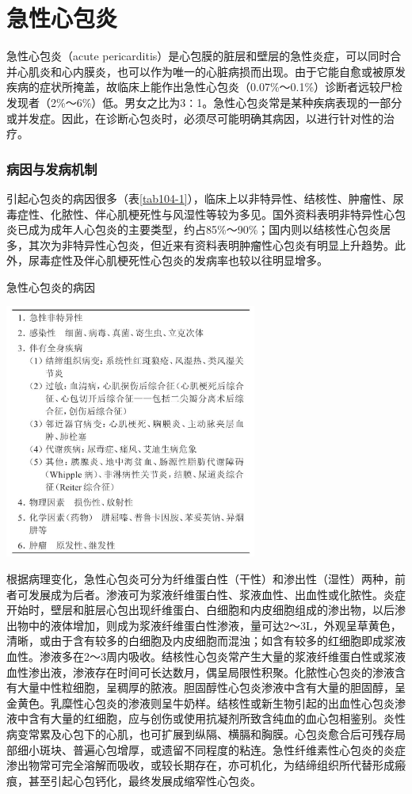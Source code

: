 \chapter{急性心包炎}

急性心包炎（acute
pericarditis）是心包膜的脏层和壁层的急性炎症，可以同时合并心肌炎和心内膜炎，也可以作为唯一的心脏病损而出现。由于它能自愈或被原发疾病的症状所掩盖，故临床上能作出急性心包炎（0.07\%～0.1\%）诊断者远较尸检发现者（2\%～6\%）低。男女之比为3∶1。急性心包炎常是某种疾病表现的一部分或并发症。因此，在诊断心包炎时，必须尽可能明确其病因，以进行针对性的治疗。

\subsection{病因与发病机制}

引起心包炎的病因很多（表\ref{tab104-1}），临床上以非特异性、结核性、肿瘤性、尿毒症性、化脓性、伴心肌梗死性与风湿性等较为多见。国外资料表明非特异性心包炎已成为成年人心包炎的主要类型，约占85\%～90\%；国内则以结核性心包炎居多，其次为非特异性心包炎，但近来有资料表明肿瘤性心包炎有明显上升趋势。此外，尿毒症性及伴心肌梗死性心包炎的发病率也较以往明显增多。

\begin{table}[htbp]
\centering
\caption{急性心包炎的病因}
\label{tab104-1}
\includegraphics[width=3.26042in,height=3.29167in]{./images/Image00470.jpg}
\end{table}

根据病理变化，急性心包炎可分为纤维蛋白性（干性）和渗出性（湿性）两种，前者可发展成为后者。渗液可为浆液纤维蛋白性、浆液血性、出血性或化脓性。炎症开始时，壁层和脏层心包出现纤维蛋白、白细胞和内皮细胞组成的渗出物，以后渗出物中的液体增加，则成为浆液纤维蛋白性渗液，量可达2～3L，外观呈草黄色，清晰，或由于含有较多的白细胞及内皮细胞而混浊；如含有较多的红细胞即成浆液血性。渗液多在2～3周内吸收。结核性心包炎常产生大量的浆液纤维蛋白性或浆液血性渗出液，渗液存在时间可长达数月，偶呈局限性积聚。化脓性心包炎的渗液含有大量中性粒细胞，呈稠厚的脓液。胆固醇性心包炎渗液中含有大量的胆固醇，呈金黄色。乳糜性心包炎的渗液则呈牛奶样。结核性或新生物引起的出血性心包炎渗液中含有大量的红细胞，应与创伤或使用抗凝剂所致含纯血的血心包相鉴别。炎性病变常累及心包下的心肌，也可扩展到纵隔、横膈和胸膜。心包炎愈合后可残存局部细小斑块、普遍心包增厚，或遗留不同程度的粘连。急性纤维素性心包炎的炎症渗出物常可完全溶解而吸收，或较长期存在，亦可机化，为结缔组织所代替形成瘢痕，甚至引起心包钙化，最终发展成缩窄性心包炎。

